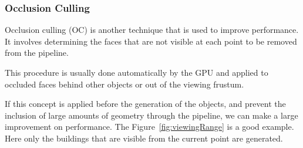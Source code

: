 \subsubsection{Occlusion Culling} %
\label{ssub:occlusion_culling}

Occlusion culling (OC) is another technique that is used to improve performance. It involves determining the faces that are not visible at each point to be removed from the pipeline.

This procedure is usually done automatically by the GPU and applied to occluded faces behind other objects or out of the viewing frustum.

If this concept is applied before the generation of the objects, and prevent the inclusion of large amounts of geometry through the pipeline, we can make a large improvement on performance. The Figure~\ref{fig:viewingRange} is a good example. Here only the buildings that are visible from the current point are generated.




